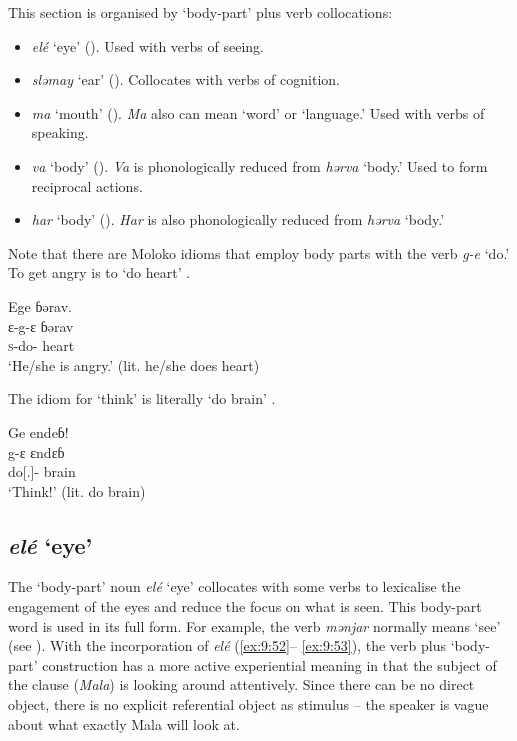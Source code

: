 This section is organised by ‘body-part’ plus verb collocations:

\begin{itemize}
\item \textit{elé} ‘eye’ (). Used with verbs of seeing. 
\item \textit{sləmay} ‘ear’ (). Collocates with verbs of cognition. 
\item \textit{ma} ‘mouth’ (). \textit{Ma} also can mean ‘word’ or ‘language.’ Used with verbs of speaking. 
\item \textit{va} ‘body’ (). \textit{Va} is phonologically reduced from \textit{hərva} ‘body.’ Used to form reciprocal actions. 
\item \textit{har} ‘body’ (). \textit{Har} is also phonologically reduced from \textit{hərva} ‘body.’ 
\end{itemize}

Note that there are Moloko idioms that employ body parts with the verb \textit{g-e} ‘do.' To get angry is to ‘do heart’ . 

\ea \label{ex:9:50}
Ege  ɓərav.\\
\gll  ɛ{}-g-ɛ   ɓərav\\
      \textsc{s}-do-{\CL}  heart\\
\glt  ‘He/she is angry.’ (lit. he/she does heart)
\z

The idiom for ‘think’ is literally ‘do brain’ . 

\ea \label{ex:9:51}
Ge  endeɓ!\\
\gll  g-ɛ       ɛndɛɓ\\
      do[{\twoS}.{\IMP}]-{\CL}  brain\\
\glt  ‘Think!’ (lit. do brain)
\z

\subsection{\textit{elé}  ‘eye’}\label{sec:9.3.1}\label{sec:9.3.1.1}

The ‘body-part’ noun \textit{elé}  ‘eye’ collocates with some verbs to lexicalise the engagement of the eyes and reduce the focus on what is seen.  This body-part word is used in its full form. For example, the verb \textit{mənjar} normally means ‘see’ (see ). With the incorporation of \textit{elé} (\ref{ex:9:52}-- \ref{ex:9:53}), the verb plus ‘body-part’ construction has a more active experiential meaning in that the subject of the clause (\textit{Mala}) is looking around attentively. Since there can be no direct object, there is no explicit referential object as stimulus -- the speaker is vague about what exactly Mala will look at. 

